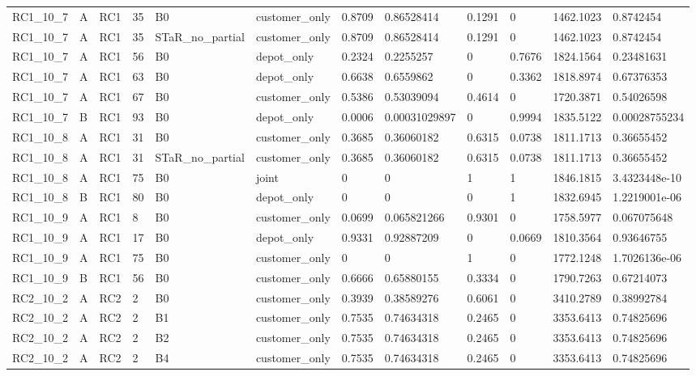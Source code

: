 \begin{longtable}{llllllllllll}
RC1\_10\_7 & A & RC1 & 35 & B0 & customer\_only & 0.8709 & 0.86528414 & 0.1291 & 0 & 1462.1023 & 0.8742454 \\
RC1\_10\_7 & A & RC1 & 35 & STaR\_no\_partial & customer\_only & 0.8709 & 0.86528414 & 0.1291 & 0 & 1462.1023 & 0.8742454 \\
RC1\_10\_7 & A & RC1 & 56 & B0 & depot\_only & 0.2324 & 0.2255257 & 0 & 0.7676 & 1824.1564 & 0.23481631 \\
RC1\_10\_7 & A & RC1 & 63 & B0 & depot\_only & 0.6638 & 0.6559862 & 0 & 0.3362 & 1818.8974 & 0.67376353 \\
RC1\_10\_7 & A & RC1 & 67 & B0 & customer\_only & 0.5386 & 0.53039094 & 0.4614 & 0 & 1720.3871 & 0.54026598 \\
RC1\_10\_7 & B & RC1 & 93 & B0 & depot\_only & 0.0006 & 0.00031029897 & 0 & 0.9994 & 1835.5122 & 0.00028755234 \\
RC1\_10\_8 & A & RC1 & 31 & B0 & customer\_only & 0.3685 & 0.36060182 & 0.6315 & 0.0738 & 1811.1713 & 0.36655452 \\
RC1\_10\_8 & A & RC1 & 31 & STaR\_no\_partial & customer\_only & 0.3685 & 0.36060182 & 0.6315 & 0.0738 & 1811.1713 & 0.36655452 \\
RC1\_10\_8 & A & RC1 & 75 & B0 & joint & 0 & 0 & 1 & 1 & 1846.1815 & 3.4323448e-10 \\
RC1\_10\_8 & B & RC1 & 80 & B0 & depot\_only & 0 & 0 & 0 & 1 & 1832.6945 & 1.2219001e-06 \\
RC1\_10\_9 & A & RC1 & 8 & B0 & customer\_only & 0.0699 & 0.065821266 & 0.9301 & 0 & 1758.5977 & 0.067075648 \\
RC1\_10\_9 & A & RC1 & 17 & B0 & depot\_only & 0.9331 & 0.92887209 & 0 & 0.0669 & 1810.3564 & 0.93646755 \\
RC1\_10\_9 & A & RC1 & 75 & B0 & customer\_only & 0 & 0 & 1 & 0 & 1772.1248 & 1.7026136e-06 \\
RC1\_10\_9 & B & RC1 & 56 & B0 & customer\_only & 0.6666 & 0.65880155 & 0.3334 & 0 & 1790.7263 & 0.67214073 \\
RC2\_10\_2 & A & RC2 & 2 & B0 & customer\_only & 0.3939 & 0.38589276 & 0.6061 & 0 & 3410.2789 & 0.38992784 \\
RC2\_10\_2 & A & RC2 & 2 & B1 & customer\_only & 0.7535 & 0.74634318 & 0.2465 & 0 & 3353.6413 & 0.74825696 \\
RC2\_10\_2 & A & RC2 & 2 & B2 & customer\_only & 0.7535 & 0.74634318 & 0.2465 & 0 & 3353.6413 & 0.74825696 \\
RC2\_10\_2 & A & RC2 & 2 & B4 & customer\_only & 0.7535 & 0.74634318 & 0.2465 & 0 & 3353.6413 & 0.74825696 \\

\end{longtable}
